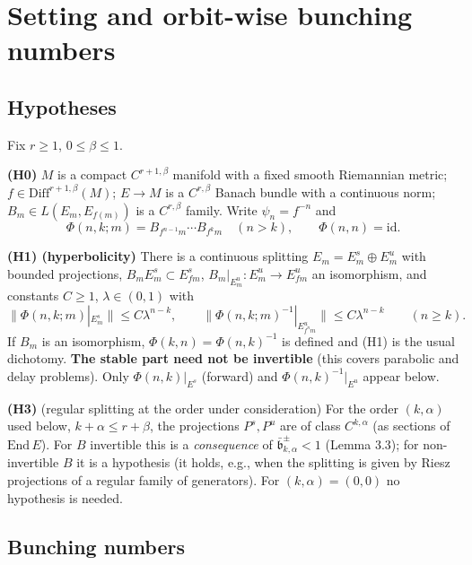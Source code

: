 \documentclass[11pt,a4paper]{article}
\theoremstyle{plain}
\theoremstyle{definition}
\theoremstyle{remark}
\numberwithin{equation}{section}
\numberwithin{figure}{section}
\begin{document}
\section{Setting and orbit-wise bunching numbers}

\subsection{Hypotheses}

Fix $r\ge1$, $0\le\beta\le1$.

\textbf{(H0)} $M$ is a compact $C^{r+1,\beta}$ manifold with a fixed smooth Riemannian metric; $f\in\mathrm{Diff}^{r+1,\beta}(M)$; $E\to M$ is a $C^{r,\beta}$ Banach bundle with a continuous norm; $B_m\in L(E_m,E_{f(m)})$ is a $C^{r,\beta}$ family. Write $\psi_n=f^{-n}$ and
\[
\Phi(n,k;m)=B_{f^{n-1}m}\cdots B_{f^{k}m}\quad(n>k),\qquad \Phi(n,n)=\mathrm{id}.
\]

\textbf{(H1) (hyperbolicity)} There is a continuous splitting $E_m=E^s_m\oplus E^u_m$ with bounded projections, $B_mE^s_m\subset E^s_{fm}$, $B_m|_{E^u_m}:E^u_m\to E^u_{fm}$ an isomorphism, and constants $C\ge1$, $\lambda\in(0,1)$ with
\[
\|\Phi(n,k;m)|_{E^s_m}\|\le C\lambda^{n-k},\qquad \|\Phi(n,k;m)^{-1}|_{E^u_{f^nm}}\|\le C\lambda^{n-k}\qquad(n\ge k).
\]
If $B_m$ is an isomorphism, $\Phi(k,n)=\Phi(n,k)^{-1}$ is defined and (H1) is the usual dichotomy. \textbf{The stable part need not be invertible} (this covers parabolic and delay problems). Only $\Phi(n,k)|_{E^s}$ (forward) and $\Phi(n,k)^{-1}|_{E^u}$ appear below.

\textbf{(H3)} (regular splitting at the order under consideration) For the order $(k,\alpha)$ used below, $k+\alpha\le r+\beta$, the projections $P^s,P^u$ are of class $C^{k,\alpha}$ (as sections of $\mathrm{End}\,E$). For $B$ invertible this is a \textit{consequence} of $\bar{\mathfrak b}^\pm_{k,\alpha}<1$ (Lemma 3.3); for non-invertible $B$ it is a hypothesis (it holds, e.g., when the splitting is given by Riesz projections of a regular family of generators). For $(k,\alpha)=(0,0)$ no hypothesis is needed.

\subsection{Bunching numbers}
\end{document}
